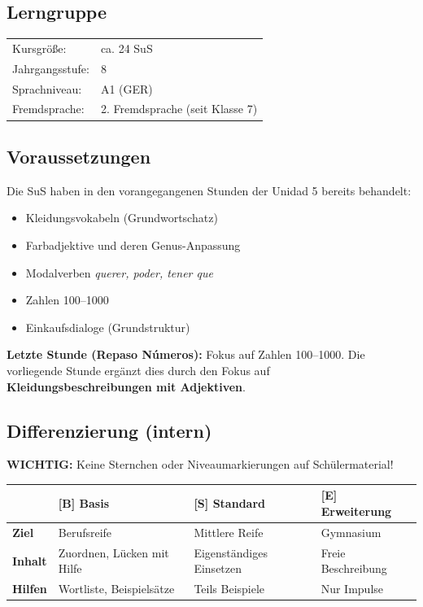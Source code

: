 \documentclass[11pt,a4paper]{article}
\newcommand{\jahrgangsstufe}{8}
\newcommand{\lerngruppengroesse}{ca. 24}
\newcommand{\gerniveau}{A1}
\newcommand{\basis}{\textcolor{basisgreen}{\textbf{[B]}}}
\newcommand{\standard}{\textcolor{standardblue}{\textbf{[S]}}}
\newcommand{\erweiterung}{\textcolor{erweiterungpurple}{\textbf{[E]}}}
\begin{document}
\subsection{Lerngruppe}
\begin{tabular}{ll}
    Kursgröße: & \lerngruppengroesse{} SuS \\
    Jahrgangsstufe: & \jahrgangsstufe \\
    Sprachniveau: & \gerniveau{} (GER) \\
    Fremdsprache: & 2. Fremdsprache (seit Klasse 7) \\
\end{tabular}

\subsection{Voraussetzungen}
Die SuS haben in den vorangegangenen Stunden der Unidad 5 bereits behandelt:
\begin{itemize}
    \item Kleidungsvokabeln (Grundwortschatz)
    \item Farbadjektive und deren Genus-Anpassung
    \item Modalverben \textit{querer, poder, tener que}
    \item Zahlen 100--1000
    \item Einkaufsdialoge (Grundstruktur)
\end{itemize}

\textbf{Letzte Stunde (Repaso Números):} Fokus auf Zahlen 100--1000. Die vorliegende Stunde ergänzt dies durch den Fokus auf \textbf{Kleidungsbeschreibungen mit Adjektiven}.

\subsection{Differenzierung (intern)}

\textbf{WICHTIG:} Keine Sternchen oder Niveaumarkierungen auf Schülermaterial!

\begin{tabular}{|l|p{3.5cm}|p{3.5cm}|p{3.5cm}|}
\hline
& \textbf{\basis{} Basis} & \textbf{\standard{} Standard} & \textbf{\erweiterung{} Erweiterung} \\
\hline
\textbf{Ziel} & Berufsreife & Mittlere Reife & Gymnasium \\
\hline
\textbf{Inhalt} & Zuordnen, Lücken mit Hilfe & Eigenständiges Einsetzen & Freie Beschreibung \\
\hline
\textbf{Hilfen} & Wortliste, Beispielsätze & Teils Beispiele & Nur Impulse \\
\hline
\end{tabular}
\end{document}
